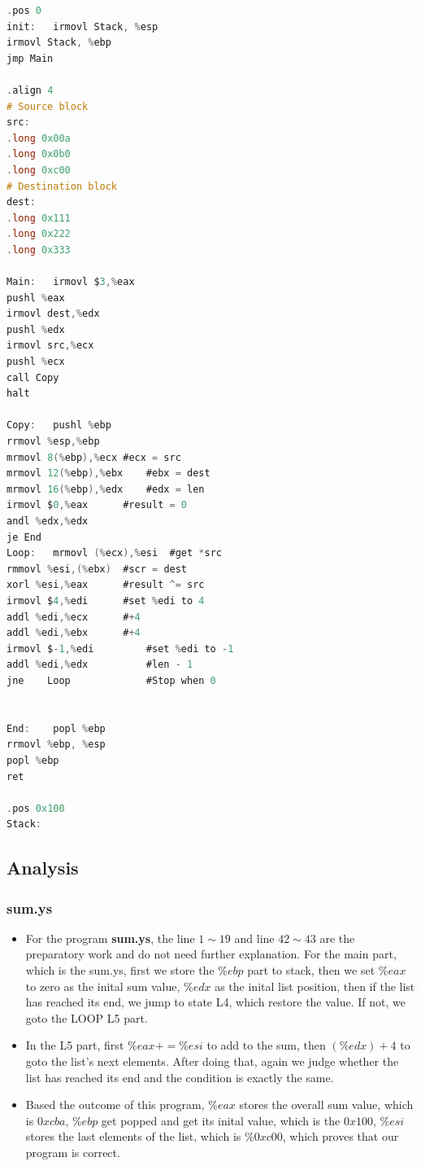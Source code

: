 \documentclass[12pt,a4paper]{article}
\theoremstyle{definition}
\numberwithin{equation}{section}
\numberwithin{figure}{section}
\begin{document}
\begin{lstlisting}[language=C,title=copy.ys]
.pos 0
init:	irmovl Stack, %esp
irmovl Stack, %ebp
jmp Main

.align 4
# Source block
src:
.long 0x00a
.long 0x0b0
.long 0xc00
# Destination block
dest:
.long 0x111
.long 0x222
.long 0x333

Main:	irmovl $3,%eax
pushl %eax
irmovl dest,%edx
pushl %edx
irmovl src,%ecx
pushl %ecx
call Copy
halt

Copy:	pushl %ebp
rrmovl %esp,%ebp
mrmovl 8(%ebp),%ecx	#ecx = src
mrmovl 12(%ebp),%ebx	#ebx = dest
mrmovl 16(%ebp),%edx	#edx = len
irmovl $0,%eax		#result = 0
andl %edx,%edx
je End
Loop:	mrmovl (%ecx),%esi	#get *src
rmmovl %esi,(%ebx)	#scr = dest
xorl %esi,%eax		#result ^= src
irmovl $4,%edi		#set %edi to 4
addl %edi,%ecx		#+4
addl %edi,%ebx		#+4
irmovl $-1,%edi	        #set %edi to -1
addl %edi,%edx          #len - 1
jne    Loop             #Stop when 0


End:	popl %ebp
rrmovl %ebp, %esp
popl %ebp
ret

.pos 0x100
Stack:
\end{lstlisting}

\subsection{Analysis}
\subsubsection{sum.ys}
\begin{itemize}
	\item For the program \textbf{sum.ys}, the line $1\sim 19$ and line $42\sim 43$ are the preparatory work and do not need further explanation.
	For the main part, which is the sum.ys, first we store the $\%ebp$ part to stack,  then we set $\%eax$ to zero as the inital sum value, $\%edx$ as the inital list position, then if the list has reached its end, we jump to state L4, which restore the value. If not, we goto the LOOP L5 part.
	\item In the L5 part, first $\%eax+=\%esi$ to add to the sum, then $(\%edx)+4$ to goto the list's next elements. After doing that, again we judge whether the list has reached its end and the condition is exactly the same.
	\item Based the outcome of this program, $\%eax$ stores the overall sum value, which is $0xcba$, $\%ebp$ get popped and get its inital value, which is the $0x100$, $\%esi$ stores the last elements of the list, which is $\%0xc00$, which proves that our program is correct.
\end{itemize}
\end{document}
